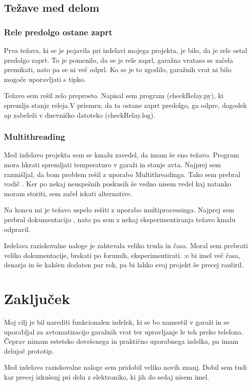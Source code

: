 \documentclass[11pt]{article}
\begin{document}
\subsection{Težave med delom}
\subsubsection{Rele predolgo ostane zaprt}
Prva težava, ki se je pojavila pri izdelavi mojega projekta, je bilo, da je rele ostal predolgo zaprt. To je pomenilo, da se je rele zaprl, garažna vrataso se začela premikati, nato pa se ni več odprl. Ko se je to zgodilo, garažnih vrat ni bilo mogoče uporavljati s tipko.

Težavo sem rešil zelo preprosto. Napisal sem program (checkRelay.py), ki spremlja stanje releja.V priemru, da ta ostane zaprt predolgo, ga odpre, dogodek ap zabeleži v dnevniško datoteko (checkRelay.log).

\subsubsection{Multithreading}
Med izdelavo projekta sem se kmalu zavedel, da imam še eno težavo. Program mora hkrati spremljati temperaturo v garaži in stanje avta. Najprej sem razmišljal, da bom problem rešil z uporabo Multithreadinga. Tako sem prebral vodič \cite{tutorialspoint_MT}. Ker po nekaj neuspešnih poskusih še vedno nisem vedel kaj natanko moram storiti, sem začel iskati alternative.

Na koncu mi je težavo uspelo rešiti z uporabo multiprocessinga. Najprej sem prebral dokumentacijo \cite{python_MP}, nato pa sem z nekaj eksperimentiranja težavo kmalu odpravil.

Izdelava raziskovalne naloge je zahtevala veliko truda in časa. Moral sem prebrati veliko dokumentacije, brskati po forumih, eksperimentirati. :e bi imel več časa, denarja in še kakšen dodaten par rok, pa bi lahko svoj projekt še precej razširil.
\newpage
\section{Zaključek}
Moj cilj je bil narediti funkcionalen izdelek, ki se bo namestil v garaži in se uporabljal za avtomatizacijo garažnih vrat ter upravljanje le teh preko telefona. Čeprav nimam estetsko dovršenega in praktično uporabnega izdelka, pa imam delujoč prototip.

Med izdelavo raziskovalne naloge sem pridobil veliko novih znanj. Dobil sem tudi kar precej izkušenj pri delu z elektroniko, ki jih do sedaj nisem imel.
\end{document}
